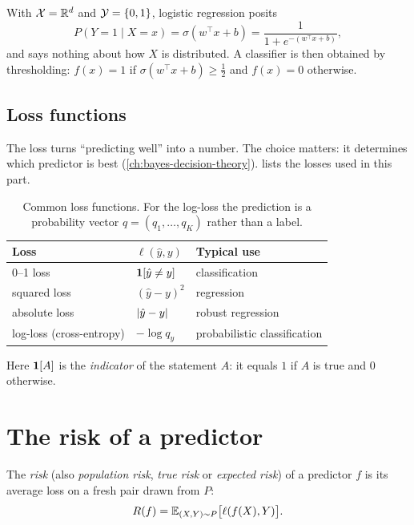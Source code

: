 \begin{notechapter}
\begin{example}
With $\mathcal{X} = \mathbb{R}^d$ and $\mathcal{Y} = \{0,1\}$, logistic regression posits
\[
  P(Y = 1 \mid X = x) = \sigma(w^\top x + b) = \frac{1}{1 + e^{-(w^\top x + b)}},
\]
and says nothing about how $X$ is distributed. A classifier is then obtained by
thresholding: $f(x) = 1$ if $\sigma(w^\top x + b) \geq \frac12$ and $f(x) = 0$
otherwise.
\end{example}

\subsection{Loss functions}

The loss turns ``predicting well'' into a number. The choice matters: it
determines which predictor is best (\cref{ch:bayes-decision-theory}).
 lists the losses used in this part.

\begin{table}[ht]
\centering
\caption{Common loss functions. For the log-loss the prediction is a
probability vector $q = (q_1, \dots, q_K)$ rather than a label.}
\label{learning-problem:tab:losses}
\begin{tabular}{@{}lll@{}}
\toprule
Loss & $\ell(\hat y, y)$ & Typical use \\
\midrule
0--1 loss & $\mathbf{1}[\hat y \neq y]$ & classification \\
squared loss & $(\hat y - y)^2$ & regression \\
absolute loss & $\left|\hat y - y\right|$ & robust regression \\
log-loss (cross-entropy) & $-\log q_y$ & probabilistic classification \\
\bottomrule
\end{tabular}
\end{table}

Here $\mathbf{1}[A]$ is the \emph{indicator} of the statement $A$: it equals $1$ if
$A$ is true and $0$ otherwise.

\section{The risk of a predictor}\label{learning-problem:sec:risk}

\begin{definition}[Risk]\label{learning-problem:def:risk}
The \emph{risk} (also \emph{population risk}, \emph{true risk} or
\emph{expected risk}) of a predictor $f$ is its average loss on a fresh pair
drawn from $P$:
\[
  R(f) = \mathbb{E}_{(X,Y)\sim P}\bigl[\ell(f(X), Y)\bigr].
\]
\end{definition}


\end{notechapter}
